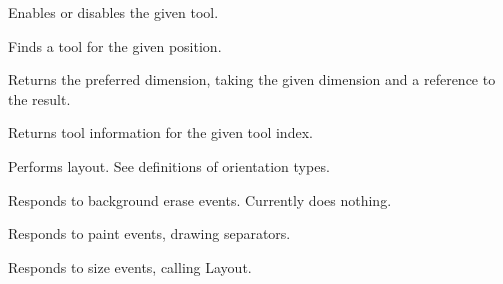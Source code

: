 
Enables or disables the given tool.


\label{wxdynamictoolbarfindtoolforposition}


Finds a tool for the given position.


\label{wxdynamictoolbargetpreferreddim}


Returns the preferred dimension, taking the given dimension and a reference to the result.


\label{wxdynamictoolbargettoolinfo}


Returns tool information for the given tool index.


\label{wxdynamictoolbarlayout}


Performs layout. See definitions of orientation types.


\label{wxdynamictoolbaronerasebackground}


Responds to background erase events. Currently does nothing.


\label{wxdynamictoolbaronpaint}


Responds to paint events, drawing separators.


\label{wxdynamictoolbaronsize}


Responds to size events, calling Layout.


\label{wxdynamictoolbarrealize}


